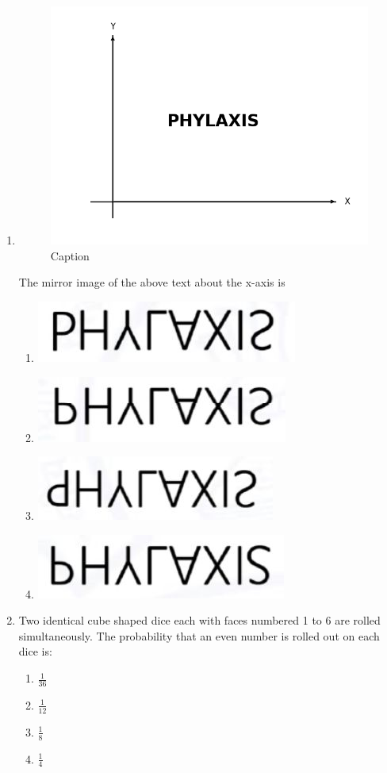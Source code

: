 \documentclass[journal]{IEEEtran}
\begin{document}
\begin{enumerate}
\item \begin{figure}[h!]
    \centering
    \includegraphics[width=0.5\linewidth]{figs/fig.png}
    \caption{Caption}
    \label{fig:enter-label}
\end{figure}
The mirror image of the above text about the x-axis is
\begin{multicols}{2}
    \begin{enumerate}
        \item \includegraphics[width = 0.5\linewidth]{figs/fig_a.jpeg}
        \item \includegraphics[width = 0.5\linewidth]{figs/fig_b.jpeg}
        \item \includegraphics[width = 0.5\linewidth]{figs/fig_c.jpeg}
        \item \includegraphics[width = 0.5\linewidth]{figs/fig_d.jpeg}
    \end{enumerate}
\end{multicols}
    
\item Two identical cube shaped dice each with faces numbered 1 to 6 are rolled simultaneously. The probability that an even number is rolled out on each dice is:
\begin{multicols}{2}
    \begin{enumerate}
        \item $\frac{1}{36}$
        \item $\frac{1}{12}$
        \item $\frac{1}{8}$
        \item $\frac{1}{4}$
    \end{enumerate}
\end{multicols}


\end{enumerate}
\end{document}
